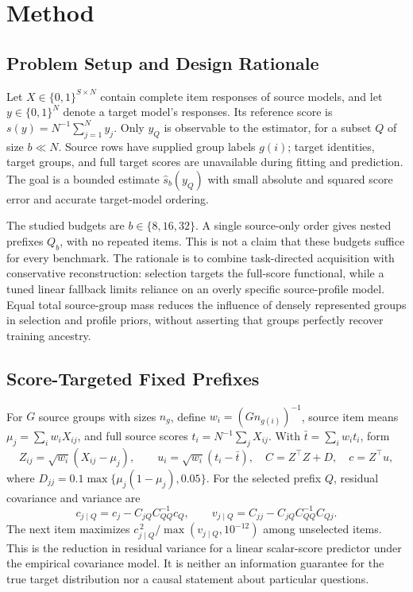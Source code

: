 \documentclass{article}
\begin{document}
\section{Method}
\subsection{Problem Setup and Design Rationale}
Let $X\in\{0,1\}^{S\times N}$ contain complete item responses of source models, and let $y\in\{0,1\}^{N}$ denote a target model's responses. Its reference score is $s(y)=N^{-1}\sum_{j=1}^{N}y_j$. Only $y_Q$ is observable to the estimator, for a subset $Q$ of size $b\ll N$. Source rows have supplied group labels $g(i)$; target identities, target groups, and full target scores are unavailable during fitting and prediction. The goal is a bounded estimate $\hat s_b(y_Q)$ with small absolute and squared score error and accurate target-model ordering.

The studied budgets are $b\in\{8,16,32\}$. A single source-only order gives nested prefixes $Q_b$, with no repeated items. This is not a claim that these budgets suffice for every benchmark. The rationale is to combine task-directed acquisition with conservative reconstruction: selection targets the full-score functional, while a tuned linear fallback limits reliance on an overly specific source-profile model. Equal total source-group mass reduces the influence of densely represented groups in selection and profile priors, without asserting that groups perfectly recover training ancestry.

\subsection{Score-Targeted Fixed Prefixes}
For $G$ source groups with sizes $n_g$, define $w_i=(G n_{g(i)})^{-1}$, source item means $\mu_j=\sum_i w_iX_{ij}$, and full source scores $t_i=N^{-1}\sum_jX_{ij}$. With $\bar t=\sum_iw_it_i$, form
\begin{equation}
 Z_{ij}=\sqrt{w_i}(X_{ij}-\mu_j),\qquad
 u_i=\sqrt{w_i}(t_i-\bar t),\quad
 C=Z^\top Z+D,\quad c=Z^\top u,
\end{equation}
where $D_{jj}=0.1\max\{\mu_j(1-\mu_j),0.05\}$. For the selected prefix $Q$, residual covariance and variance are
\begin{equation}
 c_{j\mid Q}=c_j-C_{jQ}C_{QQ}^{-1}c_Q,\qquad
 v_{j\mid Q}=C_{jj}-C_{jQ}C_{QQ}^{-1}C_{Qj}.
\end{equation}
The next item maximizes $c_{j\mid Q}^{\,2}/\max(v_{j\mid Q},10^{-12})$ among unselected items. This is the reduction in residual variance for a linear scalar-score predictor under the empirical covariance model. It is neither an information guarantee for the true target distribution nor a causal statement about particular questions.
\end{document}
